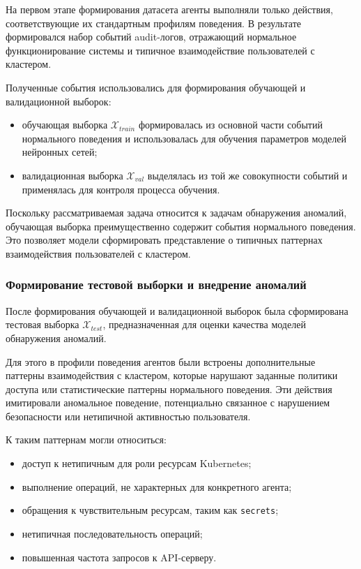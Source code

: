 На первом этапе формирования датасета агенты выполняли только действия, соответствующие их стандартным профилям поведения. В результате формировался набор событий audit-логов, отражающий нормальное функционирование системы и типичное взаимодействие пользователей с кластером.

Полученные события использовались для формирования обучающей и валидационной выборок:

\begin{itemize}
    \item обучающая выборка $\mathcal{X}_{train}$ формировалась из основной части событий нормального поведения и использовалась для обучения параметров моделей нейронных сетей;
    \item валидационная выборка $\mathcal{X}_{val}$ выделялась из той же совокупности событий и применялась для контроля процесса обучения.
\end{itemize}

Поскольку рассматриваемая задача относится к задачам обнаружения аномалий, обучающая выборка преимущественно содержит события нормального поведения. Это позволяет модели сформировать представление о типичных паттернах взаимодействия пользователей с кластером.

\subsubsection{Формирование тестовой выборки и внедрение аномалий}

После формирования обучающей и валидационной выборок была сформирована тестовая выборка $\mathcal{X}_{test}$, предназначенная для оценки качества моделей обнаружения аномалий.

Для этого в профили поведения агентов были встроены дополнительные паттерны взаимодействия с кластером, которые нарушают заданные политики доступа или статистические 
паттерны нормального поведения. Эти действия имитировали аномальное поведение, потенциально связанное с нарушением безопасности или нетипичной активностью пользователя.

К таким паттернам могли относиться:

\begin{itemize}
    \item доступ к нетипичным для роли ресурсам Kubernetes;
    \item выполнение операций, не характерных для конкретного агента;
    \item обращения к чувствительным ресурсам, таким как \texttt{secrets};
    \item нетипичная последовательность операций;
    \item повышенная частота запросов к API-серверу.
\end{itemize}

